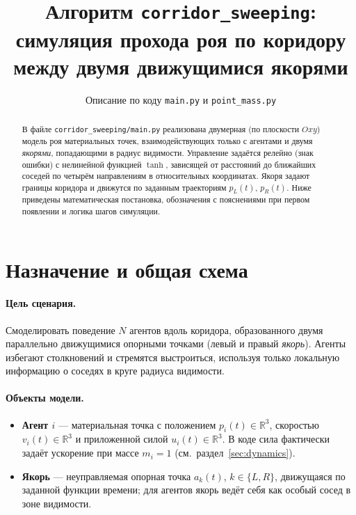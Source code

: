 \documentclass[12pt,a4paper]{article}
\title{Алгоритм \texttt{corridor\_sweeping}:\\
симуляция прохода роя по коридору между двумя движущимися якорями}
\author{Описание по коду \texttt{main.py} и \texttt{point\_mass.py}}
\date{}
\begin{document}
\maketitle

\begin{abstract}
В файле \texttt{corridor\_sweeping/main.py} реализована двумерная (по плоскости $Oxy$) модель роя материальных точек, взаимодействующих только с агентами и двумя \emph{якорями}, попадающими в радиус видимости. Управление задаётся релейно (знак ошибки) с нелинейной функцией $\tanh$, зависящей от расстояний до ближайших соседей по четырём направлениям в относительных координатах. Якоря задают границы коридора и движутся по заданным траекториям $p_L(t)$, $p_R(t)$. Ниже приведены математическая постановка, обозначения с пояснениями при первом появлении и логика шагов симуляции.
\end{abstract}

\tableofcontents
\newpage

\section{Назначение и общая схема}

\paragraph{Цель сценария.}
Смоделировать поведение $N$ агентов вдоль коридора, образованного двумя параллельно движущимися опорными точками (левый и правый \emph{якорь}). Агенты избегают столкновений и стремятся выстроиться, используя только локальную информацию о соседях в круге радиуса видимости.

\paragraph{Объекты модели.}
\begin{itemize}
  \item \textbf{Агент $i$} --- материальная точка с положением $p_i(t) \in \mathbb{R}^3$, скоростью $v_i(t) \in \mathbb{R}^3$ и приложенной силой $u_i(t) \in \mathbb{R}^3$. В коде сила фактически задаёт ускорение при массе $m_i = 1$ (см.\ раздел~\ref{sec:dynamics}).
  \item \textbf{Якорь} --- неуправляемая опорная точка $a_k(t)$, $k \in \{L,R\}$, движущаяся по заданной функции времени; для агентов якорь ведёт себя как особый сосед в зоне видимости.
\end{itemize}
\end{document}
